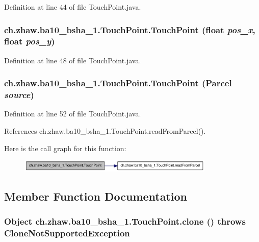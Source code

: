 Definition at line 44 of file TouchPoint.java.\hypertarget{classch_1_1zhaw_1_1ba10__bsha__1_1_1TouchPoint_a17cb410a388f8ca317ac65f981eac6ec}{
\subsubsection[{TouchPoint}]{\setlength{\rightskip}{0pt plus 5cm}ch.zhaw.ba10\_\-bsha\_\-1.TouchPoint.TouchPoint (float {\em pos\_\-x}, \/  float {\em pos\_\-y})}}
\label{classch_1_1zhaw_1_1ba10__bsha__1_1_1TouchPoint_a17cb410a388f8ca317ac65f981eac6ec}


Definition at line 48 of file TouchPoint.java.\hypertarget{classch_1_1zhaw_1_1ba10__bsha__1_1_1TouchPoint_ad882a2ee5e211bfefaa73c1322cf1823}{
\subsubsection[{TouchPoint}]{\setlength{\rightskip}{0pt plus 5cm}ch.zhaw.ba10\_\-bsha\_\-1.TouchPoint.TouchPoint (Parcel {\em source})}}
\label{classch_1_1zhaw_1_1ba10__bsha__1_1_1TouchPoint_ad882a2ee5e211bfefaa73c1322cf1823}


Definition at line 52 of file TouchPoint.java.

References ch.zhaw.ba10\_\-bsha\_\-1.TouchPoint.readFromParcel().

Here is the call graph for this function:\nopagebreak
\begin{figure}[H]
\begin{center}
\leavevmode
\includegraphics[width=265pt]{classch_1_1zhaw_1_1ba10__bsha__1_1_1TouchPoint_ad882a2ee5e211bfefaa73c1322cf1823_cgraph}
\end{center}
\end{figure}


\subsection{Member Function Documentation}
\hypertarget{classch_1_1zhaw_1_1ba10__bsha__1_1_1TouchPoint_ac71c9f7fa232435af2314d0d707e7559}{
\subsubsection[{clone}]{\setlength{\rightskip}{0pt plus 5cm}Object ch.zhaw.ba10\_\-bsha\_\-1.TouchPoint.clone ()  throws CloneNotSupportedException }}
\label{classch_1_1zhaw_1_1ba10__bsha__1_1_1TouchPoint_ac71c9f7fa232435af2314d0d707e7559}


